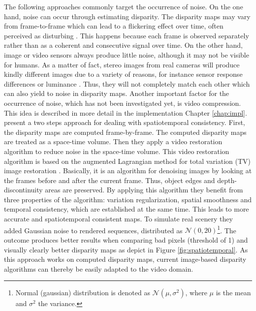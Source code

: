 The following approaches commonly target the occurrence of noise.
On the one hand, noise can occur through estimating disparity.
The disparity maps may vary from frame-to-frame which can lead to a flickering effect over time, often perceived as disturbing \citep{khoshabeh2011spatio}.
This happens because each frame is observed separately rather than as a coherent and consecutive signal over time.
On the other hand, image or video sensors always produce little noise, although it may not be visible for humans.
As a matter of fact, stereo images from real cameras will produce kindly different images due to a variety of reasons, for instance sensor response differences or luminance \citep{khoshabeh2011spatio, cyganek2011introduction}.
Thus, they will not completely match each other which can also yield to noise in disparity maps.
Another important factor for the occurrence of noise, which has not been investigated yet, is video compression.
This idea is described in more detail in the implementation Chapter \ref{chap:impl}.
\newline\newline\noindent \citeauthor{khoshabeh2011spatio} \citep{khoshabeh2011spatio} present a two steps approach for dealing with spatiotemporal consistency.
First, the disparity maps are computed frame-by-frame.
The computed disparity maps are treated as a space-time volume.
Then they apply a video restoration algorithm to reduce noise in the space-time volume.
This video restoration algorithm is based on the augmented Lagrangian method for total variation (TV) image restoration \citep{chan2011augmented}.
Basically, it is an algorithm for denoising images by looking at the frames before and after the current frame.
Thus, object edges and depth-discontinuity areas are preserved.
By applying this algorithm they benefit from three properties of the algorithm: variation regularization, spatial smoothness and temporal consistency, which are established at the same time.
This leads to more accurate and spatiotemporal consistent maps.
To simulate real scenery they added Gaussian noise to rendered sequences, distributed as $\mathcal{N}(0,20)$\footnote{Normal (gaussian) distribution is denoted as $\mathcal{N}(\mu,\sigma^2)$, where $\mu$ is the mean and $\sigma^2$ the variance.}.
The outcome produces better results when comparing bad pixels (threshold of 1) and visually clearly better disparity maps as depict in Figure \ref{fig:spatiotemporal}.
As this approach works on computed disparity maps, current image-based disparity algorithms can thereby be easily adapted to the video domain.
